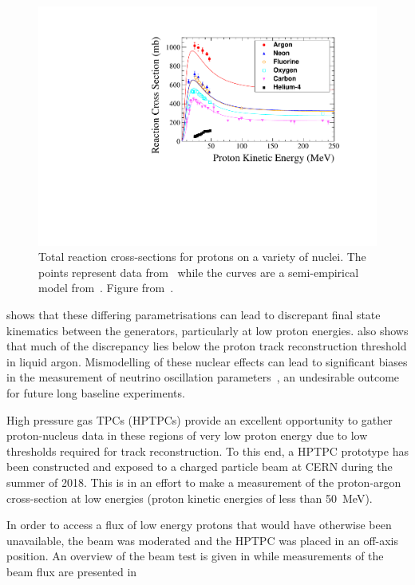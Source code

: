 \begin{figure}[h]
  \centering
  \includegraphics[width=.8\linewidth]{files/figures/hptpc_beam_flux/DataProtonCrossSections}
  \caption[Proton-nucleus cross-section data compared with a semi-empirical model]{Total reaction cross-sections for protons on a variety of nuclei. The points represent data from~\cite{protonXSecData} while the curves are a semi-empirical model from~\cite{protonXSecModel}. Figure from~\cite{hptpcProposal}.}
  \label{fig:protonNucleus}
\end{figure}

 shows that these differing parametrisations can lead to discrepant final state kinematics between the generators, particularly at low proton energies.
 also shows that much of the discrepancy lies below the proton track reconstruction threshold in liquid argon.
Mismodelling of these nuclear effects can lead to significant biases in the measurement of neutrino oscillation parameters~\cite{nuclearMismodelOsc}, an undesirable outcome for future long baseline experiments.

High pressure gas TPCs (HPTPCs) provide an excellent opportunity to gather proton-nucleus data in these regions of very low proton energy due to low thresholds required for track reconstruction.
To this end, a HPTPC prototype has been constructed and exposed to a charged particle beam at CERN during the summer of 2018.
This is in an effort to make a measurement of the proton-argon cross-section at low energies (proton kinetic energies of less than \SI{50}{\mega\electronvolt}).

In order to access a flux of low energy protons that would have otherwise been unavailable, the beam was moderated and the HPTPC was placed in an off-axis position. 
An overview of the beam test is given in  while measurements of the beam flux are presented in 

